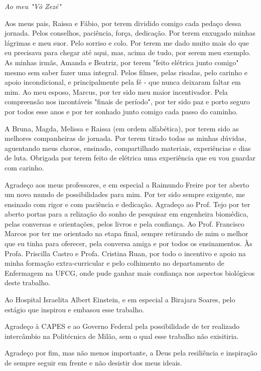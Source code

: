 \documentclass[
	12pt,				%
	openright,			%
	twoside,			%
	a4paper,			%
	english,			%
	french,				%
	spanish,			%
	brazil				%
	]{abntex2}
\begin{document}
\begin{dedicatoria}
   \vspace*{\fill}
   \centering
   \noindent
   \textit{ Ao meu "V\^o Zez\'e"} \vspace*{\fill}
\end{dedicatoria}

\begin{agradecimentos}
Aos meus pais, Raissa e Fábio, por terem dividido comigo cada pedaço dessa jornada. Pelos conselhos, paciência, força, dedicação. Por terem enxugado minhas lágrimas e meu suor. Pelo sorriso e colo. Por terem me dado muito mais do que eu precisava para chegar até aqui, mas, acima de tudo, por serem meu exemplo. As minhas irmãs, Amanda e Beatriz, por terem "feito elétrica junto comigo" mesmo sem saber fazer uma integral. Pelos filmes, pelas risadas, pelo carinho e apoio incondicional, e principalmente pela fé - que nunca deixaram faltar em mim. Ao meu esposo, Marcus, por ter sido meu maior incentivador. Pela compreensão nos incontáveis "finais de período", por ter sido paz e porto seguro por todos esse anos e por ter sonhado junto comigo cada passo do caminho.

A Bruna, Magda, Melissa e Raissa (em ordem alfabética), por terem sido as melhores companheiras de jornada. Por terem tirado todas as minhas dúvidas, aguentando meus choros, ensinado, compartilhado materiais, experiências e dias de luta. Obrigada por terem feito de elétrica uma experiência que eu vou guardar com carinho.

Agradeço aos meus professores, e em especial a Raimundo Freire por ter aberto um novo mundo de possibilidades para mim. Por ter sido sempre exigente, me ensinado com rigor e com paciência e dedicação. Agradeço ao Prof. Tejo por ter aberto portas para a relização do sonho de pesquisar em engenheira biomédica, pelas conversas e orientações, pelos livros e pela confiança. Ao Prof. Francisco Marcos por ter me orientado na etapa final, sempre retirando de mim o melhor que eu tinha para oferecer, pela conversa amiga e por todos os ensinamentos. Às Profa. Priscilla Castro e Profa. Cristina Ruan, por todo o incentivo e apoio na minha formação extra-curricular e pelo colhimento no departamento de Enfermagem na UFCG, onde pude ganhar mais confiança nos aspectos biológicos deste trabalho.

Ao Hospital Israelita Albert Einstein, e em especial a Birajara Soares, pelo estágio que inspirou e embasou esse trabalho.

Agradeço à CAPES e ao Governo Federal pela possibilidade de ter realizado intercâmbio na Politécnica de Milão, sem o qual esse trabalho não exisitiria.

Agradeço por fim, mas não menos importante, a Deus pela resiliência e inspiração de sempre seguir em frente e não desistir dos meus ideais.


\end{agradecimentos}
\end{document}
